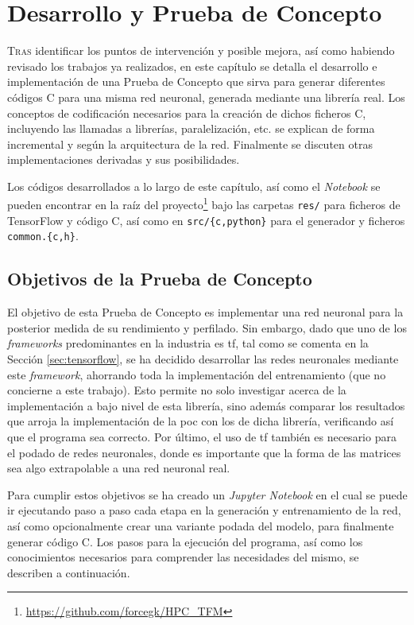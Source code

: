 \chapter{Desarrollo y Prueba de Concepto}
\label{chap:desarrollo_poc}

\lettrine{T}{ras} identificar los puntos de intervención y posible mejora, así como habiendo revisado los trabajos ya realizados, en este capítulo se detalla el desarrollo e implementación de una Prueba de Concepto que sirva para generar diferentes códigos C para una misma red neuronal, generada mediante una librería real. Los conceptos de codificación necesarios para la creación de dichos ficheros C, incluyendo las llamadas a librerías, paralelización, etc. se explican de forma incremental y según la arquitectura de la red. Finalmente se discuten otras implementaciones derivadas y sus posibilidades.

Los códigos desarrollados a lo largo de este capítulo, así como el \textit{Notebook} se pueden encontrar en la raíz del proyecto\footnote{\url{https://github.com/forcegk/HPC_TFM}} bajo las carpetas \texttt{res/} para ficheros de TensorFlow y código C, así como en \texttt{src/\{c,python\}} para el generador y ficheros \texttt{common.\{c,h\}}.

\section{Objetivos de la Prueba de Concepto}
\label{sec:objetivos_poc}
El objetivo de esta Prueba de Concepto es implementar una red neuronal para la posterior medida de su rendimiento y perfilado. Sin embargo, dado que uno de los \textit{frameworks} predominantes en la industria es \acrlong{tf}, tal como se comenta en la Sección \ref{sec:tensorflow}, se ha decidido desarrollar las redes neuronales mediante este \textit{framework}, ahorrando toda la implementación del entrenamiento (que no concierne a este trabajo). Esto permite no solo investigar acerca de la implementación a bajo nivel de esta librería, sino además comparar los resultados que arroja la implementación de la \acrshort{poc} con los de dicha librería, verificando así que el programa sea correcto. Por último, el uso de \acrlong{tf} también es necesario para el podado de redes neuronales, donde es importante que la forma de las matrices sea algo extrapolable a una red neuronal real.

Para cumplir estos objetivos se ha creado un \textit{Jupyter Notebook} en el cual se puede ir ejecutando paso a paso cada etapa en la generación y entrenamiento de la red, así como opcionalmente crear una variante podada del modelo, para finalmente generar código C. Los pasos para la ejecución del programa, así como los conocimientos necesarios para comprender las necesidades del mismo, se describen a continuación.

